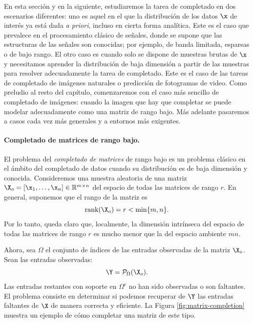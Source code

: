 \documentclass[../../book-main_es.tex]{subfiles}
\begin{document}
En esta sección y en la siguiente, estudiaremos la tarea de completado en
dos escenarios diferentes: uno es aquel en el que la distribución de los datos
$\x$ de interés ya está dada {\em a priori}, incluso en cierta
forma analítica. Este es el caso que prevalece en el procesamiento clásico de señales,
donde se supone que las estructuras de las señales son
conocidas; por ejemplo, de banda limitada, esparsas o de bajo rango. El otro caso es
cuando solo se dispone de muestras brutas de $\x$ y necesitamos aprender la
distribución de baja dimensión a partir de las muestras para resolver
adecuadamente la tarea de completado. Este es el caso de las tareas de
completado de imágenes naturales o predicción de fotogramas de video. Como preludio al resto
del capítulo, comenzaremos con el caso más sencillo de completado de imágenes:
cuando la imagen que hay que completar se puede modelar adecuadamente como una matriz de rango bajo.
Más adelante pasaremos a casos cada vez más generales y a entornos más
exigentes.

\paragraph{Completado de matrices de rango bajo.}
El problema del {\em completado de matrices} de rango bajo es un problema clásico en el ámbito del completado de datos cuando
su distribución es de baja dimensión y conocida. Consideremos una muestra aleatoria
de una matriz $\X_o =
[\x_1, \ldots, \x_n] \in \mathbb{R}^{m\times n}$ del espacio de
todas las matrices de rango $r$. En general, suponemos que el rango
de la matriz es
\begin{equation}
    \mbox{rank}(\X_o) = r < \min\{m, n\}.
\end{equation}
Por lo tanto, queda claro que, localmente, la dimensión intrínseca del espacio de
todas las matrices de rango $r$ es mucho menor que la del espacio ambiente $mn$.

Ahora, sea $\Omega$ el conjunto de índices de las entradas observadas de
la matriz $\X_o$. Sean las entradas observadas:
\begin{equation}
    \Y = \mathcal{P}_{\Omega}(\X_o).
\end{equation}
Las entradas restantes con soporte en $\Omega^c$ no han sido observadas o son
faltantes. El problema consiste en determinar si podemos recuperar de $\Y$ las entradas
faltantes de $\X$ de manera correcta y eficiente. La Figura
\ref{fig:matrix-completion} muestra un
ejemplo de cómo completar una matriz de este tipo.
\end{document}

